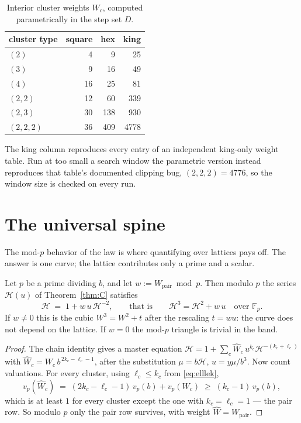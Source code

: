 \documentclass[11pt]{article}
\newcommand{\Wp}{W_{\mathrm{pair}}}
\newcommand{\F}{\mathbb{F}}
\begin{document}
\begin{table}[H]
\centering
\begin{tabular}{l r r r}
\toprule
cluster type & square & hex & king \\
\midrule
$(2)$       & 4  & 9   & 25 \\
$(3)$       & 9  & 16  & 49 \\
$(4)$       & 16 & 25  & 81 \\
$(2,2)$     & 12 & 60  & 339 \\
$(2,3)$     & 30 & 138 & 930 \\
$(2,2,2)$   & 36 & 409 & 4778 \\
\bottomrule
\end{tabular}
\caption{Interior cluster weights $W_c$, computed parametrically in the step set
$D$.}
\label{tab:weights}
\end{table}

The king column reproduces every entry of an independent king-only weight table.
Run at too small a search window the parametric version instead reproduces that
table's documented clipping bug, $(2,2,2) = 4776$, so the window size is checked
on every run.

\section{The universal spine}
\label{sec:spine}

The mod-$p$ behavior of the law is where quantifying over lattices pays off. The
answer is one curve; the lattice contributes only a prime and a scalar.

\begin{theorem}
\label{thm:B}
Let $p$ be a prime dividing $b$, and let $w := \Wp \bmod p$. Then modulo $p$ the
series $\mathcal H(u)$ of Theorem~\ref{thm:C} satisfies
\[
  \mathcal H \;=\; 1 + w\,u\,\mathcal H^{-2},
  \qquad\text{that is}\qquad
  \mathcal H^3 = \mathcal H^2 + w\,u \quad\text{over } \F_p .
\]
If $w \ne 0$ this is the cubic $W^3 = W^2 + t$ after the rescaling $t = wu$: the
curve does not depend on the lattice. If $w = 0$ the mod-$p$ triangle is trivial
in the band.
\end{theorem}

\begin{proof}
The chain identity gives a master equation
$\mathcal H = 1 + \sum_c \widehat W_c\, u^{k_c}\mathcal H^{-(k_c+\ell_c)}$ with
$\widehat W_c = W_c\, b^{\,2k_c - \ell_c - 1}$, after the substitution
$\mu = b\mathcal H$, $u = y\mu/b^3$. Now count valuations. For every cluster,
using $\ell_c \le k_c$ from \eqref{eq:elllek},
\[
  v_p(\widehat W_c) \;=\; (2k_c - \ell_c - 1)\,v_p(b) + v_p(W_c)
  \;\ge\; (k_c - 1)\,v_p(b) ,
\]
which is at least $1$ for every cluster except the one with
$k_c = \ell_c = 1$ --- the pair row. So modulo $p$ only the pair row survives,
with weight $\widehat W = \Wp$.
\end{proof}
\end{document}
